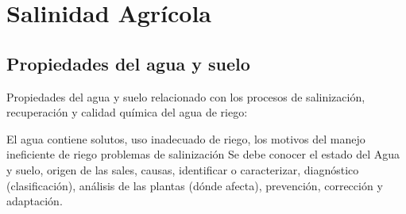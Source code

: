 \chapter{Salinidad Agrícola}
\section{Propiedades del agua y suelo}
Propiedades del agua y suelo relacionado con los procesos de salinización, recuperación y calidad química del agua de riego:

El agua contiene solutos, uso inadecuado de riego, los motivos del manejo ineficiente de riego 
problemas de salinización 
Se debe conocer el estado del Agua y suelo, origen de las sales, causas, identificar o caracterizar, diagnóstico (clasificación), análisis de las plantas (dónde afecta), prevención, corrección y adaptación. 
